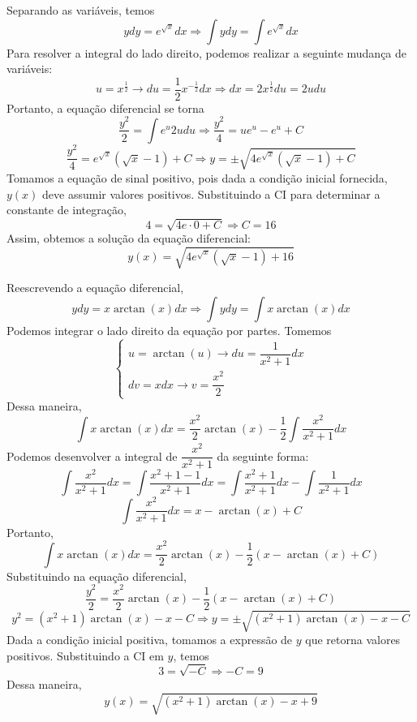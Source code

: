 \documentclass[oneside,12pt,a4paper]{report}
\begin{document}
    \begin{resolucao}
        \itemresolucao Separando as variáveis, temos
        \[ydy=e^{\sqrt{x}}dx\Rightarrow\int ydy=\int e^{\sqrt{x}}dx\]
        Para resolver a integral do lado direito, podemos realizar a seguinte mudança de variáveis:
        \[
            u=x^{\frac{1}{2}}\rightarrow du=\frac{1}{2}x^{-\frac{1}{2}}dx\Rightarrow dx=2x^{\frac{1}{2}}du=2udu
        \]
        Portanto, a equação diferencial se torna
        \[\frac{y^2}{2}=\int e^u2udu\Rightarrow\frac{y^2}{4}=ue^u-e^u+C\]
        \[\frac{y^2}{4}=e^{\sqrt{x}}(\sqrt{x}-1)+C\Rightarrow y=\pm\sqrt{4e^{\sqrt{x}}(\sqrt{x}-1)+C}\]
        Tomamos a equação de sinal positivo, pois dada a condição inicial fornecida, $y(x)$ deve assumir valores positivos. Substituindo a CI para determinar a constante de integração,
        \[4=\sqrt{4e\cdot0+C}\Rightarrow C=16\]
        Assim, obtemos a solução da equação diferencial:
        \[\boxed{y(x)=\sqrt{4e^{\sqrt{x}}(\sqrt{x}-1)+16}}\]

        \itemresolucao Reescrevendo a equação diferencial,
        \[ydy=x\arctan(x)dx\Rightarrow\int ydy=\int x\arctan(x)dx\]
        Podemos integrar o lado direito da equação por partes. Tomemos
        \[\begin{cases}
            u=\arctan(u)\rightarrow du=\dfrac{1}{x^2+1}dx\\
            dv=xdx\rightarrow v=\dfrac{x^2}{2}
        \end{cases}\]
        Dessa maneira,
        \[\int x\arctan(x)dx=\frac{x^2}{2}\arctan(x)-\frac{1}{2}\int\frac{x^2}{x^2+1}dx \]
        Podemos desenvolver a integral de $\dfrac{x^2}{x^2+1}$ da seguinte forma:
        \[\int\frac{x^2}{x^2+1}dx=\int\frac{x^2+1-1}{x^2+1}dx=\int\frac{x^2+1}{x^2+1}dx-\int\frac{1}{x^2+1}dx\]
        \[\int\frac{x^2}{x^2+1}dx=x-\arctan(x)+C\]
        Portanto, 
        \[\int x\arctan(x)dx=\frac{x^2}{2}\arctan(x)-\frac{1}{2}(x-\arctan(x)+C)\]
        Substituindo na equação diferencial,
        \[\frac{y^2}{2}=\frac{x^2}{2}\arctan(x)-\frac{1}{2}(x-\arctan(x)+C)\]
        \[y^2=(x^2+1)\arctan(x)-x-C\Rightarrow y=\pm\sqrt{(x^2+1)\arctan(x)-x-C}\]
        Dada a condição inicial positiva, tomamos a expressão de $y$ que retorna valores positivos. Substituindo a CI em $y$, temos
        \[3=\sqrt{-C}\Rightarrow -C=9\]
        Dessa maneira,
        \[\boxed{y(x)=\sqrt{(x^2+1)\arctan(x)-x+9}}\]

    \end{resolucao}
\end{document}
